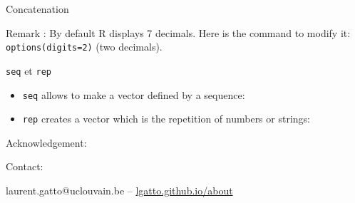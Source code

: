 \documentclass{beamer}
\theoremstyle{example}
\begin{document}
\begin{frame}[fragile]{Concatenation}

  Remark : By default R displays 7 decimals. Here is the command to
  modify it: \texttt{options(digits=2)} (two decimals).

\end{frame}


\begin{frame}[fragile]{\texttt{seq} et \texttt{rep}}

  \vspace{-.2cm}
  \begin{itemize}
  \item \texttt{seq} allows to make a vector defined by a sequence:

  \item \texttt{rep} creates a vector which is the repetition of numbers or strings:
  \end{itemize}

\end{frame}



\begin{frame}%

\vspace{.1cm}


Acknowledgement:

\bigskip

Contact:

\begin{center}
  laurent.gatto@uclouvain.be – \url{lgatto.github.io/about}
\end{center}
 
\end{frame}
\end{document}
